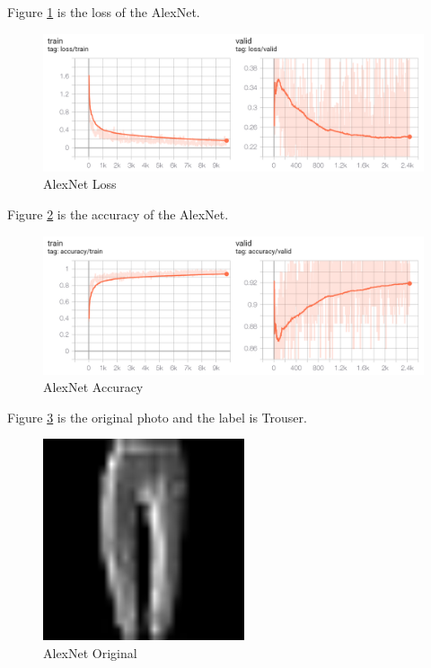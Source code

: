 \documentclass{../../Latex_Template/Homework/homework}
\begin{document}
  \begin{arabicparts}
    \setcounter{partCounter}{1}
    \questionpart 
    Figure \ref{fig:alexnet_loss} is the loss of the AlexNet.
    \begin{figure}[H]
      \begin{center}
        \includegraphics[width=0.5\linewidth]{Alexnet_loss.png}
        \caption{AlexNet Loss}
        \label{fig:alexnet_loss}
      \end{center}
    \end{figure}

    Figure \ref{fig:alexnet_accuracy} is the accuracy of the AlexNet.
    \begin{figure}[H]
      \begin{center}
        \includegraphics[width=0.5\linewidth]{Alexnet_accuracy.png}
        \caption{AlexNet Accuracy}
        \label{fig:alexnet_accuracy}
      \end{center}
    \end{figure}

    \questionpart
    Figure \ref{fig:alexnet_original} is the original photo and the label is
    Trouser.
    \begin{figure}[H]
      \begin{center}
        \includegraphics[width=0.5\linewidth]{Alexnet_original.png}
        \caption{AlexNet Original}
        \label{fig:alexnet_original}
      \end{center}
    \end{figure}


\end{arabicparts}
\end{document}

